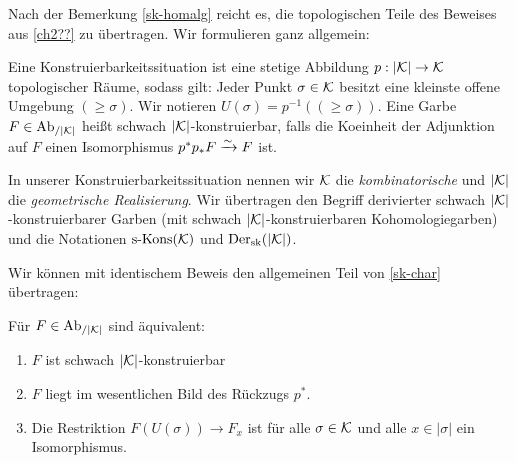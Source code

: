 Nach der Bemerkung \ref{sk-homalg} reicht es, die topologischen Teile
des Beweises aus \ref{ch2??} zu übertragen. Wir formulieren ganz
allgemein:
\begin{defn}
  Eine Konstruierbarkeitssituation ist eine stetige Abbildung $p: |\mathcal{K}|
  \to \mathcal{K}$ topologischer Räume, sodass gilt: Jeder Punkt $\sigma \in
  \mathcal{K}$ besitzt eine kleinste offene Umgebung $(\geq \sigma)$. Wir
  notieren $U(\sigma) = p^{-1}((\geq \sigma))$. Eine Garbe $F \in
  \operatorname{Ab}_{/|\mathcal{K}|}$ heißt schwach $|\mathcal{K}|$-konstruierbar, falls die Koeinheit der
  Adjunktion auf $F$ einen Isomorphismus $p^* p_* F \xrightarrow[]{\sim} F$ ist.
\end{defn}
In unserer Konstruierbarkeitssituation nennen wir $\mathcal{K}$ die
\emph{kombinatorische} und $|\mathcal{K}|$ die \emph{geometrische
  Realisierung}. Wir übertragen den Begriff derivierter schwach
$|\mathcal{K}|$-konstruierbarer Garben (mit schwach $|\mathcal{K}|$-konstruierbaren
Kohomologiegarben) und die Notationen $\operatorname{s-Kons}(\mathcal{K})$ und $\operatorname{Der}_{\mathrm{sk}}(|\mathcal{K}|)$.

Wir können mit identischem Beweis den allgemeinen Teil von
\ref{sk-char} übertragen:
\begin{prop} \label{gensk-char}
  Für $F \in \operatorname{Ab}_{/|\mathcal{K}|}$ sind äquivalent:
  \begin{enumerate}[label=(\arabic*)]
  \item \label{itm:gensk-char-sk} $F$ ist schwach $|\mathcal{K}|$-konstruierbar
  \item \label{itm:gensk-char-essim} $F$ liegt im wesentlichen Bild
    des Rückzugs $p^*$.
  \item \label{itm:gensk-char-res} Die Restriktion $F(U(\sigma)) \to
    F_x$ ist für alle $\sigma \in \mathcal{K}$ und alle $x \in |\sigma|$ ein
    Isomorphismus.
  \end{enumerate}
\end{prop}

